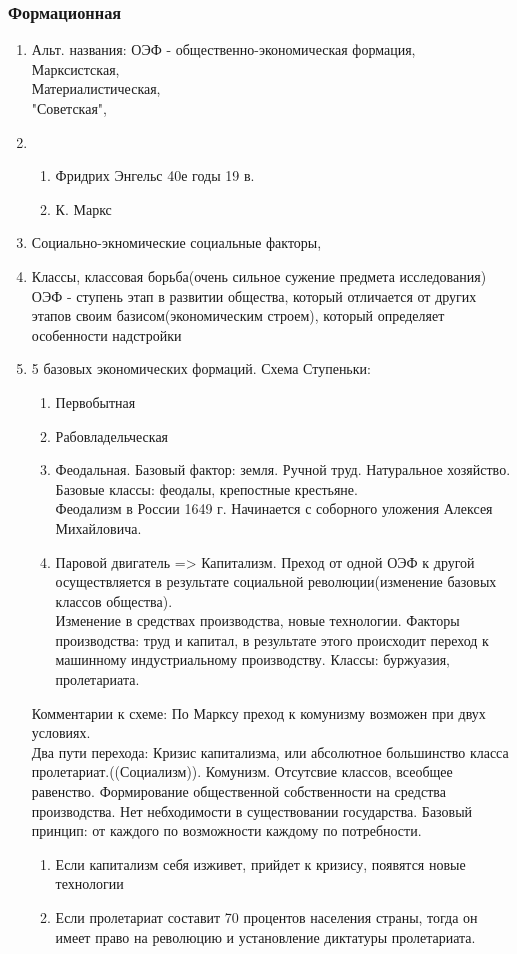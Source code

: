 \documentclass[a4paper]{article}
\begin{document}
\subsubsection{Формационная}
\begin{enumerate}
\item Альт. названия:
ОЭФ - общественно-экономическая формация, \\
Марксистская, \\
Материалистическая, \\
"Советская", \\
\item
    \begin{enumerate}
    \item Фридрих Энгельс 40е годы 19 в.
    \item К. Маркс
    \end{enumerate}
\item Социально-экномические социальные факторы,
\item Классы, классовая борьба(очень сильное сужение предмета исследования) \\
    ОЭФ - ступень этап в развитии общества, который отличается от других этапов своим базисом(экономическим строем), который определяет особенности надстройки
\item 5 базовых экономических формаций. Схема Ступеньки:
    \begin{enumerate}
        \item Первобытная
        \item Рабовладельческая
        \item Феодальная. Базовый фактор: земля. Ручной труд. Натуральное хозяйство. Базовые классы: феодалы, крепостные крестьяне. \\
        Феодализм в России 1649 г. Начинается с соборного уложения Алексея Михайловича.
        \item Паровой двигатель => Капитализм. Преход от одной ОЭФ к другой осуществляется в результате социальной революции(изменение базовых классов общества). \\ Изменение в средствах производства, новые технологии. Факторы производства: труд и капитал, в результате этого происходит переход к машинному индустриальному производству. Классы: буржуазия, пролетариата.
    \end{enumerate}


    Комментарии к схеме:
    По Марксу преход к комунизму возможен при двух условиях. \\
    Два пути перехода: Кризис капитализма, или абсолютное большинство класса пролетариат.((Социализм)). Комунизм. Отсутсвие классов, всеобщее равенство. Формирование общественной собственности на средства производства. Нет небходимости в существовании государства. Базовый принцип: от каждого по возможности каждому по потребности.
    \begin{enumerate}
    \item Если капитализм себя изживет, прийдет к кризису, появятся новые технологии
    \item Если пролетариат составит 70 процентов населения страны, тогда он имеет право на революцию и установление диктатуры пролетариата.
    \end{enumerate}


\end{enumerate}
\end{document}
